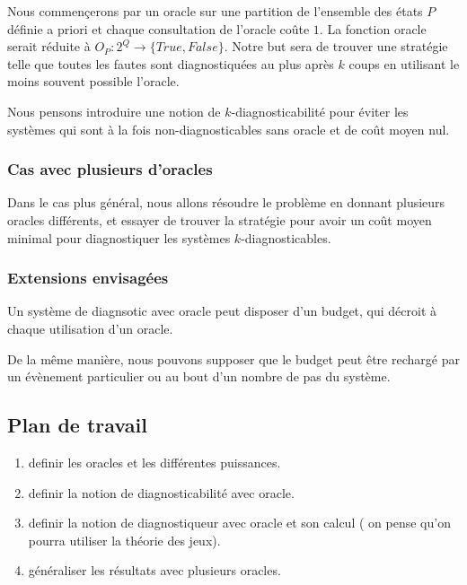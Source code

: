 \documentclass[a4paper,10pt]{article}
\begin{document}
Nous commen\c cerons par un oracle sur une partition de l'ensemble des états $P$ d\'efinie a priori et chaque consultation de l'oracle co\^ute $1$. La fonction oracle serait r\'eduite \`a $O_P : 2^Q \to \{True, False\}$. Notre but sera de trouver une strat\'egie telle que toutes les fautes sont diagnostiqu\'ees au plus apr\`es $k$ coups en utilisant le moins souvent possible l'oracle.

Nous pensons introduire une notion de $k$-diagnosticabilit\'e pour \'eviter les syst\`emes qui sont \`a la fois non-diagnosticables sans oracle et de co\^ut moyen nul.

\subsubsection{Cas avec plusieurs d'oracles}

Dans le cas plus g\'en\'eral, nous allons r\'esoudre le probl\`eme en donnant plusieurs oracles diff\'erents, et essayer de trouver la strat\'egie pour avoir un co\^ut moyen minimal pour diagnostiquer les syst\`emes $k$-diagnosticables.

\subsubsection{Extensions envisag\'ees}

Un système de diagnsotic avec oracle peut disposer d'un budget, qui décroit \`a chaque utilisation d'un oracle.

De la m\^eme mani\`ere, nous pouvons supposer que le budget peut \^etre recharg\'e par un \'ev\`enement particulier ou au bout d'un nombre de pas du syst\`eme.

\subsection{Plan de travail}

\begin{enumerate}
\item definir les oracles et les diff\'erentes puissances.
\item definir la notion de diagnosticabilité avec oracle.
\item definir la notion de diagnostiqueur avec oracle et son calcul ( on pense qu'on pourra utiliser la théorie des jeux).
\item g\'en\'eraliser les r\'esultats avec plusieurs oracles.
\end{enumerate}
\end{document}
